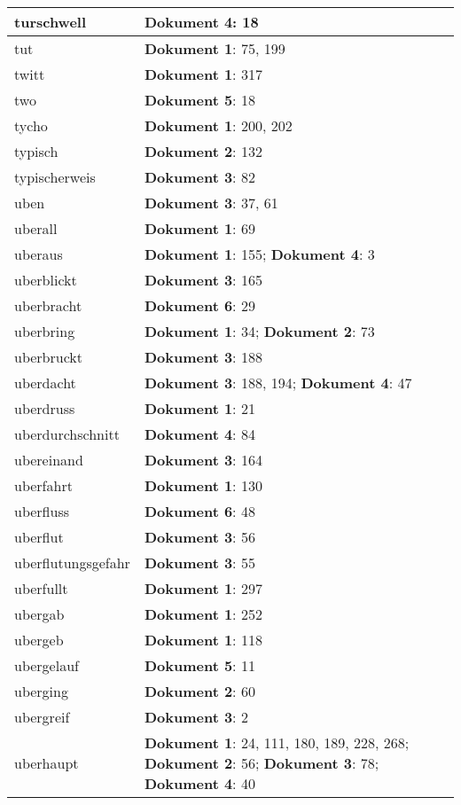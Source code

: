 \documentclass[a5paper]{article}
\begin{document}
\begin{longtable}[l]{|l|p{3in}|}
\hline
turschwell & \textbf{Dokument 4}: 18 \\
\hline
tut & \textbf{Dokument 1}: 75, 199 \\
\hline
twitt & \textbf{Dokument 1}: 317 \\
\hline
two & \textbf{Dokument 5}: 18 \\
\hline
tycho & \textbf{Dokument 1}: 200, 202 \\
\hline
typisch & \textbf{Dokument 2}: 132 \\
\hline
typischerweis & \textbf{Dokument 3}: 82 \\
\hline
uben & \textbf{Dokument 3}: 37, 61 \\
\hline
uberall & \textbf{Dokument 1}: 69 \\
\hline
uberaus & \textbf{Dokument 1}: 155; \textbf{Dokument 4}: 3 \\
\hline
uberblickt & \textbf{Dokument 3}: 165 \\
\hline
uberbracht & \textbf{Dokument 6}: 29 \\
\hline
uberbring & \textbf{Dokument 1}: 34; \textbf{Dokument 2}: 73 \\
\hline
uberbruckt & \textbf{Dokument 3}: 188 \\
\hline
uberdacht & \textbf{Dokument 3}: 188, 194; \textbf{Dokument 4}: 47 \\
\hline
uberdruss & \textbf{Dokument 1}: 21 \\
\hline
uberdurchschnitt & \textbf{Dokument 4}: 84 \\
\hline
ubereinand & \textbf{Dokument 3}: 164 \\
\hline
uberfahrt & \textbf{Dokument 1}: 130 \\
\hline
uberfluss & \textbf{Dokument 6}: 48 \\
\hline
uberflut & \textbf{Dokument 3}: 56 \\
\hline
uberflutungsgefahr & \textbf{Dokument 3}: 55 \\
\hline
uberfullt & \textbf{Dokument 1}: 297 \\
\hline
ubergab & \textbf{Dokument 1}: 252 \\
\hline
ubergeb & \textbf{Dokument 1}: 118 \\
\hline
ubergelauf & \textbf{Dokument 5}: 11 \\
\hline
uberging & \textbf{Dokument 2}: 60 \\
\hline
ubergreif & \textbf{Dokument 3}: 2 \\
\hline
uberhaupt & \textbf{Dokument 1}: 24, 111, 180, 189, 228, 268; \textbf{Dokument 2}: 56; \textbf{Dokument 3}: 78; \textbf{Dokument 4}: 40 \\

\end{longtable}
\end{document}
